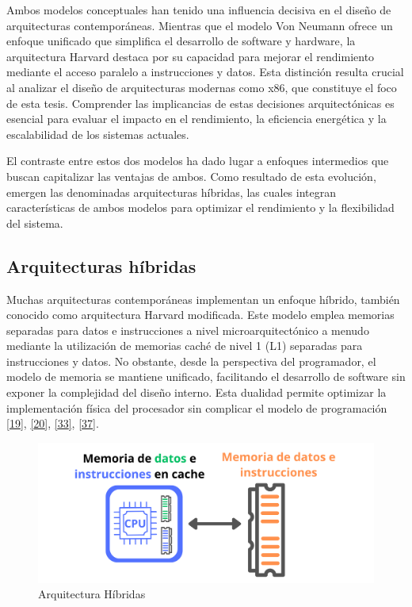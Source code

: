 \documentclass[12pt,oneside]{templates/unerthesis}
\begin{document}
Ambos modelos conceptuales han tenido una influencia decisiva en el diseño de arquitecturas contemporáneas. Mientras que el modelo Von Neumann ofrece un enfoque unificado que simplifica el desarrollo de software y hardware, la arquitectura Harvard destaca por su capacidad para mejorar el rendimiento mediante el acceso paralelo a instrucciones y datos. Esta distinción resulta crucial al analizar el diseño de arquitecturas modernas como x86, que constituye el foco de esta tesis. Comprender las implicancias de estas decisiones arquitectónicas es esencial para evaluar el impacto en el rendimiento, la eficiencia energética y la escalabilidad de los sistemas actuales.

El contraste entre estos dos modelos ha dado lugar a enfoques intermedios que buscan capitalizar las ventajas de ambos. Como resultado de esta evolución, emergen las denominadas arquitecturas híbridas, las cuales integran características de ambos modelos para optimizar el rendimiento y la flexibilidad del sistema.

\hypertarget{arquitecturas-huxedbridas}{%
\subsection{Arquitecturas híbridas}\label{arquitecturas-huxedbridas}}

Muchas arquitecturas contemporáneas implementan un enfoque híbrido, también conocido como arquitectura Harvard modificada. Este modelo emplea memorias separadas para datos e instrucciones a nivel microarquitectónico a menudo mediante la utilización de memorias caché de nivel 1 (L1) separadas para instrucciones y datos. No obstante, desde la perspectiva del programador, el modelo de memoria se mantiene unificado, facilitando el desarrollo de software sin exponer la complejidad del diseño interno. Esta dualidad permite optimizar la implementación física del procesador sin complicar el modelo de programación \protect\hyperlink{ref-hennessy2017computer}{{[}19{]}}, \protect\hyperlink{ref-stallings_computer_2021}{{[}20{]}}, \protect\hyperlink{ref-null_essentials_2023}{{[}33{]}}, \protect\hyperlink{ref-patterson_computer_2017}{{[}37{]}}.

\begin{figure}

{\centering \includegraphics[width=0.85\linewidth]{images/hibrida} 

}

\caption{Arquitectura Híbridas}\label{fig:hibrida}
\end{figure}
\end{document}
